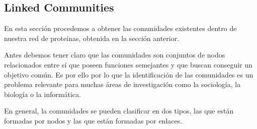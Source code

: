 \subsection{Linked Communities}
En esta sección procedemos a obtener las comunidades existentes dentro de nuestra red de proteínas, obtenida en la sección anterior.

Antes debemos tener claro que las comunidades son conjuntos de nodos relacionados entre sí que poseen funciones semejantes y que buscan conseguir un objetivo común. 
Es por ello por lo que la identificación de las comunidades es un problema relevante para muchas áreas de investigación como la sociología, la biología o la informática.

En general, la comunidades se pueden clasificar en dos tipos, las que están formadas por nodos y las que están formadas por enlaces.

